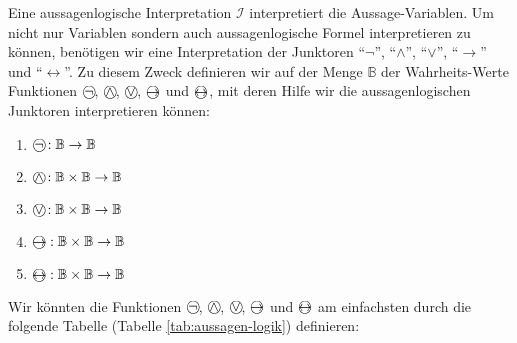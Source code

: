 Eine aussagenlogische Interpretation $\mathcal{I}$ interpretiert die Aussage-Variablen.
Um nicht nur Variablen sondern auch aussagenlogische Formel interpretieren zu können, 
benötigen wir eine
Interpretation der Junktoren ``$\neg$'', ``$\wedge$'', ``$\vee$'', ``$\rightarrow$'' und
``$\leftrightarrow$''.  Zu diesem Zweck definieren wir auf der Menge $\mathbb{B}$ der Wahr\-heits-Werte
Funktionen
$\circneg$, $\circwedge$, $\circvee$, $\circright$ und $\circleftright$,
mit deren Hilfe wir die aussagenlogischen Junktoren interpretieren können:
\begin{enumerate}
\item $\circneg: \mathbb{B} \rightarrow \mathbb{B}$
\item $\circwedge: \mathbb{B} \times \mathbb{B} \rightarrow \mathbb{B}$
\item $\circvee: \mathbb{B} \times \mathbb{B} \rightarrow \mathbb{B}$
\item $\circright: \mathbb{B} \times \mathbb{B} \rightarrow \mathbb{B}$
\item $\circleftright: \mathbb{B} \times \mathbb{B} \rightarrow \mathbb{B}$
\end{enumerate}
Wir könnten die Funktionen $\circneg$, $\circwedge$, $\circvee$, $\circright$ und $\circleftright$ am
einfachsten durch die folgende Tabelle (Tabelle \ref{tab:aussagen-logik}) definieren:  


